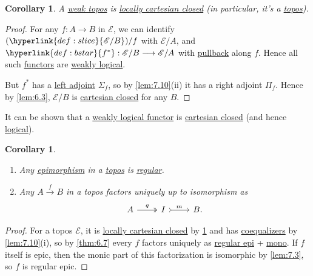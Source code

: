 \documentclass{article}
\newcommand{\ec}{\mathscr{E}}
\let\to\longrightarrow
\newtheorem{ncor}[nthm]{Corollary}
\begin{document}
\begin{ncor}\label{cor:7.13}
  A \hyperlink{def:wtopos}{weak topos} is \hyperlink{def:lcc}{locally cartesian closed} (in particular, it's a \hyperlink{def:topos}{topos}).
\end{ncor}
\begin{proof}
  For any $f: A \to B$ in $\mathscr{E}$, we can identify $(\hyperlink{def:slice}{\mathscr{E}/B})/f$ with $\mathscr{E}/A$, and $\hyperlink{def:bstar}{f^*}: \mathscr{E}/B \to \mathscr{E}/A$ with \hyperlink{def:pullback}{pullback} along $f$.
  Hence all such \hyperlink{def:funct}{functors} are \hyperlink{def:wtopos}{weakly logical}.

  But $f^*$ has a \hyperlink{def:adj}{left adjoint} $\Sigma_f$, so by \cref{lem:7.10}(ii) it has a right adjoint $\Pi_f$.
  Hence by \cref{lem:6.3}, $\mathscr{E}/B$ is \hyperlink{def:cc}{cartesian closed} for any $B$.
\end{proof}
\begin{remark}
  It can be shown that a \hyperlink{def:wtopos}{weakly logical functor} is \hyperlink{def:ccfunct}{cartesian closed} (and hence \hyperlink{def:lFunct}{logical}).
\end{remark}
\begin{ncor}\leavevmode\label{cor:7.14}
  \begin{enumerate}[label=(\roman*)]
    \item Any \hyperlink{def:epic}{epimorphism} in a \hyperlink{def:topos}{topos} is \hyperlink{def:regular}{regular}.
    \item Any $A \overset{f}\to B$ in a topos factors uniquely up to isomorphism as
      \begin{equation*}
        \begin{tikzcd}
        A \rar[two heads]{q} & I \rar[tail]{m} & B.
        \end{tikzcd}
      \end{equation*}
  \end{enumerate}
\end{ncor}
\begin{proof}
  For a topos $\ec$, it is \hyperlink{def:lcc}{locally cartesian closed} by \cref{cor:7.13} and has \hyperlink{def:equalizer}{coequalizers} by \cref{lem:7.10}(i), so by \cref{thm:6.7} every $f$ factors uniquely as \hyperlink{def:epic}{regular epi} + \hyperlink{def:monic}{mono}.
  If $f$ itself is epic, then the monic part of this factorization is isomorphic by \cref{lem:7.3}, so $f$ is regular epic.
\end{proof}
\clearpage
\end{document}
